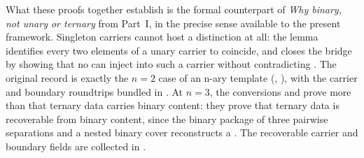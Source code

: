\documentclass[11pt]{article}
\begin{document}
\begin{code}
\AgdaSpace{}%
\AgdaBound{\AgdaUnderscore{}}\AgdaSpace{}%
\AgdaSpace{}%
\<%
\\
%
\>[2]\AgdaSymbol{;}\AgdaSpace{}%
\AgdaSpace{}%
\AgdaSymbol{=}\AgdaSpace{}%
\AgdaSpace{}%
\AgdaBound{\AgdaUnderscore{}}\AgdaSpace{}%
\AgdaSpace{}%
\<%
\\
%
\>[2]\AgdaSymbol{;}\AgdaSpace{}%
\AgdaSpace{}%
\AgdaSymbol{=}\AgdaSpace{}%
\AgdaSpace{}%
\AgdaBound{\AgdaUnderscore{}}\AgdaSpace{}%
\AgdaSpace{}%
\<%
\\
%
\>[2]\AgdaSymbol{;}\AgdaSpace{}%
\AgdaSpace{}%
\AgdaSymbol{=}\AgdaSpace{}%
\AgdaSpace{}%
\AgdaBound{\AgdaUnderscore{}}\AgdaSpace{}%
\AgdaSpace{}%
\<%
\\
%
\>[2]\AgdaSymbol{;}\AgdaSpace{}%
\AgdaSpace{}%
\AgdaSymbol{=}\AgdaSpace{}%
\AgdaSpace{}%
\AgdaBound{\AgdaUnderscore{}}\AgdaSpace{}%
\AgdaSpace{}%
\<%
\\
%
\>[2]\AgdaSymbol{\}}\<%
\end{code}

What these proofs together establish is the formal counterpart of
\emph{Why binary, not unary or ternary} from Part~I, in the precise
sense available to the present framework.  Singleton carriers cannot
host a distinction at all: the lemma
 identifies every two elements of
a unary carrier to coincide, and 
closes the bridge by showing that no  can
inject into such a carrier without contradicting
.  The original record is exactly the $n=2$
case of an n-ary template (,
), with the carrier and boundary
roundtrips bundled in
.  At $n=3$, the conversions
 and  prove
more than that ternary data carries binary content: they prove that
ternary data is recoverable from binary content, since the binary
package of three pairwise separations and a nested binary cover
reconstructs a  .  The
recoverable carrier and boundary fields are collected in
.
\end{document}
